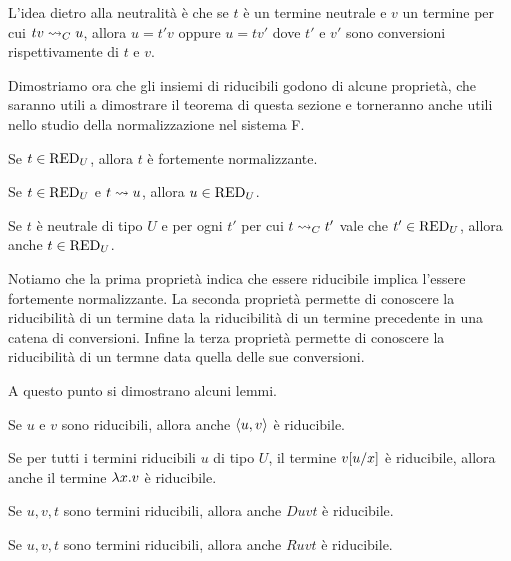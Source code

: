 \documentclass[]{marticle}
\begin{document}
L'idea dietro alla neutralit\`a \`e che se $t$ \`e un termine neutrale e $v$ un
termine per cui $tv \rightsquigarrow_C u$, allora $u = t' v$ oppure $u=tv'$ dove $t'$ e $v'$
sono conversioni rispettivamente di $t$ e $v$.

Dimostriamo ora che gli insiemi di riducibili godono di alcune propriet\`a, che
saranno utili a dimostrare il teorema di questa sezione e torneranno anche utili
nello studio della normalizzazione nel sistema F.

\begin{block}[Proposizione]
    \begin{nlist}[CR1]
        \item Se $t\in \text{RED}_{U}$, allora $t$ \`e fortemente normalizzante.
        \item Se $t\in \text{RED}_{U}$ e $t\rightsquigarrow u$, allora $u\in\text{RED}_{U}$.
        \item Se $t$ \`e neutrale di tipo $U$ e per ogni $t'$ per cui $t\rightsquigarrow_C
            t'$ vale che $t'\in\text{RED}_{U}$, allora anche $t\in\text{RED}_{U}$.
    \end{nlist}
\end{block}

Notiamo che la prima propriet\`a indica che essere riducibile implica l'essere
fortemente normalizzante. La seconda propriet\`a permette di conoscere la
riducibilit\`a di un termine data la riducibilit\`a di un termine precedente in
una catena di conversioni. Infine la terza propriet\`a permette di conoscere la
riducibilit\`a di un termne data quella delle sue conversioni.

A questo punto si dimostrano alcuni lemmi.
\begin{block}[Lemma]
    Se $u$ e $v$ sono riducibili, allora anche $\langle u,v \rangle$ \`e riducibile.
\end{block}

\begin{block}[Lemma]
    Se per tutti i termini riducibili $u$ di tipo $U$, il termine $v[u/x]$
    \`e riducibile, allora anche il termine $\lambda x.v$ \`e riducibile.
\end{block}

\begin{block}[Lemma]
    Se $u, v, t$ sono termini riducibili, allora anche $D uvt$ \`e riducibile.
\end{block}

\begin{block}[Lemma]
    Se $u, v, t$ sono termini riducibili, allora anche $R uvt$ \`e riducibile.
\end{block}
\end{document}
